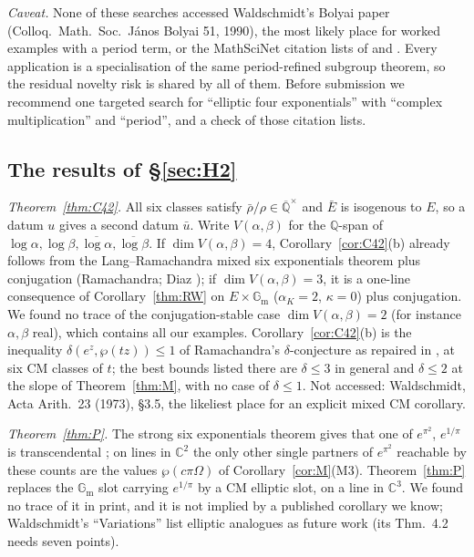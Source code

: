 \documentclass[11pt]{amsart}
\theoremstyle{definition}
\newcommand{\Qb}{\overline{\mathbb{Q}}}
\newcommand{\C}{\mathbb{C}}
\newcommand{\Q}{\mathbb{Q}}
\newcommand{\Gm}{\mathbb{G}_{\mathrm m}}
\begin{document}
\emph{Caveat.} None of these searches accessed Waldschmidt's Bolyai paper \cite{W90} (Colloq.\ Math.\ Soc.\ J\'anos Bolyai
51, 1990), the most likely place for worked examples with a period term, or the MathSciNet citation lists of \cite{RW93}
and \cite{W88}. Every application is a specialisation of the same period-refined subgroup theorem, so the residual
novelty risk is shared by all of them. Before submission we recommend one targeted search for ``elliptic four exponentials''
with ``complex multiplication'' and ``period'', and a check of those citation lists.

\subsection{The results of \S\ref{sec:H2}}\label{sec:novH2}
\emph{Theorem~\ref{thm:C42}.} All six classes satisfy $\bar\rho/\rho\in\Qb^\times$ and $\bar E$ is isogenous to $E$, so a datum
$u$ gives a second datum $\bar u$. Write $V(\alpha,\beta)$ for the $\Q$-span of $\log\alpha,\log\beta,\overline{\log\alpha},
\overline{\log\beta}$. If $\dim V(\alpha,\beta)=4$, Corollary~\ref{cor:C42}(b) already follows from the Lang--Ramachandra mixed six
exponentials theorem \cite[Thm.~24]{W06} plus conjugation (Ramachandra; Diaz \cite{Di04}); if $\dim V(\alpha,\beta)=3$, it is a
one-line consequence of Corollary~\ref{thm:RW} on $E\times\Gm$ ($\alpha_K=2$, $\kappa=0$) plus conjugation. We found no trace of
the conjugation-stable case $\dim V(\alpha,\beta)=2$ (for instance $\alpha,\beta$ real), which contains all our examples.
Corollary~\ref{cor:C42}(b) is the inequality $\delta(e^z,\wp(tz))\le1$ of Ramachandra's $\delta$-conjecture as repaired in
\cite[\S2(a)]{W13}, at six CM classes of $t$; the best bounds listed there are $\delta\le3$ in general and $\delta\le2$ at the slope
of Theorem~\ref{thm:M}, with no case of $\delta\le1$. Not accessed: Waldschmidt, Acta Arith.\ 23 (1973), \S3.5, the likeliest
place for an explicit mixed CM corollary.

\emph{Theorem~\ref{thm:P}.} The strong six exponentials theorem gives that one of $e^{\pi^2}$, $e^{1/\pi}$ is transcendental
\cite[Cor.~1(3)]{Di07}; on lines in $\C^2$ the only other single partners of $e^{\pi^2}$ reachable by these counts are the values
$\wp(c\pi\Omega)$ of Corollary~\ref{cor:M}(M3). Theorem~\ref{thm:P} replaces the $\Gm$ slot carrying $e^{1/\pi}$ by a CM elliptic
slot, on a line in $\C^3$. We found no trace of it in print, and it is not implied by a published corollary we know;
Waldschmidt's ``Variations'' \cite{W05} list elliptic analogues as future work (its Thm.~4.2 needs seven points).
\end{document}
